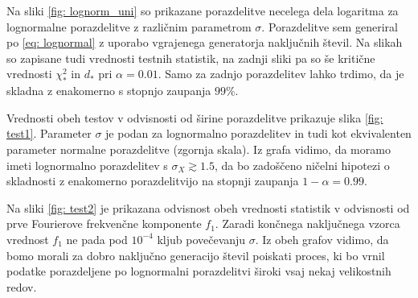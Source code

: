 \documentclass[11pt, oneside]{article}
\theoremstyle{definition}
\newtheorem{definition}{Definicija}
\begin{document}
Na sliki \ref{fig: lognorm_uni} so prikazane porazdelitve necelega dela logaritma za lognormalne porazdelitve z
različnim parametrom $\sigma$. Porazdelitve sem generiral po \ref{eq: lognormal} z uporabo vgrajenega generatorja
naključnih števil. Na slikah so zapisane tudi vrednosti testnih statistik, na zadnji sliki pa so še
kritične vrednosti $\chi^2_*$ in $d_*$ pri $\alpha=0.01$.
Samo za zadnjo porazdelitev lahko trdimo, da je skladna z enakomerno s stopnjo zaupanja $99\%$.

Vrednosti obeh testov v odvisnosti od širine porazdelitve prikazuje slika \ref{fig: test1}.
Parameter $\sigma$ je podan za lognormalno porazdelitev in tudi kot ekvivalenten parameter normalne porazdelitve (zgornja skala).
Iz grafa vidimo, da moramo imeti lognormalno porazdelitev s $\sigma_X \gtrsim 1.5$,
da bo zadoščeno ničelni hipotezi o skladnosti z enakomerno porazdelitvijo na stopnji zaupanja $1-\alpha=0.99$.

Na sliki \ref{fig: test2} je prikazana odvisnost obeh vrednosti statistik v odvisnosti od prve Fourierove frekvenčne
komponente $f_1$. Zaradi končnega naključnega vzorca vrednost $f_1$ ne pada pod $10^{-4}$ kljub povečevanju
$\sigma$. Iz obeh grafov vidimo, da bomo morali za dobro naključno generacijo števil poiskati proces, ki bo
vrnil podatke porazdeljene po lognormalni porazdelitvi široki vsaj nekaj velikostnih redov.

\end{document}
